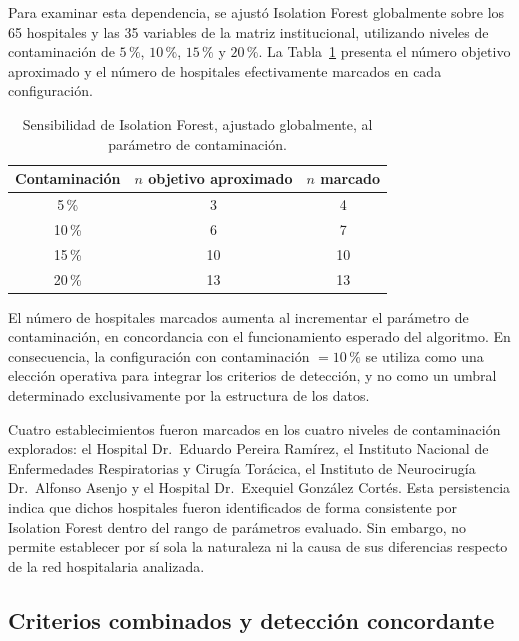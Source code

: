 Para examinar esta dependencia, se ajustó Isolation Forest globalmente sobre los 65 hospitales y las 35 variables de la matriz institucional, utilizando niveles de contaminación de $5\,\%$, $10\,\%$, $15\,\%$ y $20\,\%$. La Tabla~\ref{tab:sensibilidad-contaminacion} presenta el número objetivo aproximado y el número de hospitales efectivamente marcados en cada configuración.

\begin{table}[htbp]
\centering
\caption{Sensibilidad de Isolation Forest, ajustado globalmente, al parámetro de contaminación.}
\label{tab:sensibilidad-contaminacion}
\begin{tabular}{c c c}
\toprule
\textbf{Contaminación} & \textbf{$n$ objetivo aproximado} & \textbf{$n$ marcado} \\
\midrule
5\,\%  & 3  & 4 \\
10\,\% & 6  & 7 \\
15\,\% & 10 & 10 \\
20\,\% & 13 & 13 \\
\bottomrule
\end{tabular}
\end{table}

El número de hospitales marcados aumenta al incrementar el parámetro de contaminación, en concordancia con el funcionamiento esperado del algoritmo. En consecuencia, la configuración con contaminación $=10\,\%$ se utiliza como una elección operativa para integrar los criterios de detección, y no como un umbral determinado exclusivamente por la estructura de los datos.

Cuatro establecimientos fueron marcados en los cuatro niveles de contaminación explorados: el Hospital Dr.\ Eduardo Pereira Ramírez, el Instituto Nacional de Enfermedades Respiratorias y Cirugía Torácica, el Instituto de Neurocirugía Dr.\ Alfonso Asenjo y el Hospital Dr.\ Exequiel González Cortés. Esta persistencia indica que dichos hospitales fueron identificados de forma consistente por Isolation Forest dentro del rango de parámetros evaluado. Sin embargo, no permite establecer por sí sola la naturaleza ni la causa de sus diferencias respecto de la red hospitalaria analizada.

\subsection{Criterios combinados y detección concordante}

\label{sec:res-outliers-combinados}

